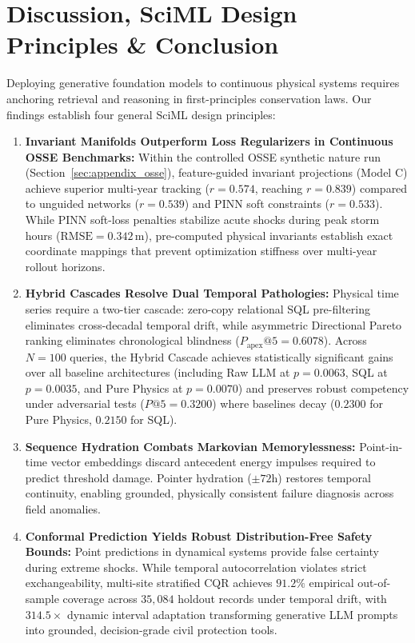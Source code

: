 \documentclass[journal]{IEEEtran}
\begin{document}
\section{Discussion, SciML Design Principles \& Conclusion}
\label{sec:discussion}
Deploying generative foundation models to continuous physical systems requires anchoring retrieval and reasoning in first-principles conservation laws. Our findings establish four general SciML design principles:
\begin{enumerate}
    \setlength{\itemsep}{0.5pt}\setlength{\parskip}{0pt}
    \item \textbf{Invariant Manifolds Outperform Loss Regularizers in Continuous OSSE Benchmarks:} Within the controlled OSSE synthetic nature run (Section~\ref{sec:appendix_osse}), feature-guided invariant projections (Model C) achieve superior multi-year tracking ($r = 0.574$, reaching $r = 0.839$) compared to unguided networks ($r = 0.539$) and PINN soft constraints ($r = 0.533$). While PINN soft-loss penalties stabilize acute shocks during peak storm hours ($\text{RMSE} = 0.342\,\text{m}$), pre-computed physical invariants establish exact coordinate mappings that prevent optimization stiffness over multi-year rollout horizons.
    \item \textbf{Hybrid Cascades Resolve Dual Temporal Pathologies:} Physical time series require a two-tier cascade: zero-copy relational SQL pre-filtering eliminates cross-decadal temporal drift, while asymmetric Directional Pareto ranking eliminates chronological blindness ($P_{\text{apex}}@5 = 0.6078$). Across $N = 100$ queries, the Hybrid Cascade achieves statistically significant gains over all baseline architectures (including Raw LLM at $p = 0.0063$, SQL at $p = 0.0035$, and Pure Physics at $p = 0.0070$) and preserves robust competency under adversarial tests ($P@5 = 0.3200$) where baselines decay ($0.2300$ for Pure Physics, $0.2150$ for SQL).
    \item \textbf{Sequence Hydration Combats Markovian Memorylessness:} Point-in-time vector embeddings discard antecedent energy impulses required to predict threshold damage. Pointer hydration ($\pm 72\text{h}$) restores temporal continuity, enabling grounded, physically consistent failure diagnosis across field anomalies.
    \item \textbf{Conformal Prediction Yields Robust Distribution-Free Safety Bounds:} Point predictions in dynamical systems provide false certainty during extreme shocks. While temporal autocorrelation violates strict exchangeability, multi-site stratified CQR achieves $91.2\%$ empirical out-of-sample coverage across $35{,}084$ holdout records under temporal drift, with $314.5\times$ dynamic interval adaptation transforming generative LLM prompts into grounded, decision-grade civil protection tools.
\end{enumerate}
\end{document}
